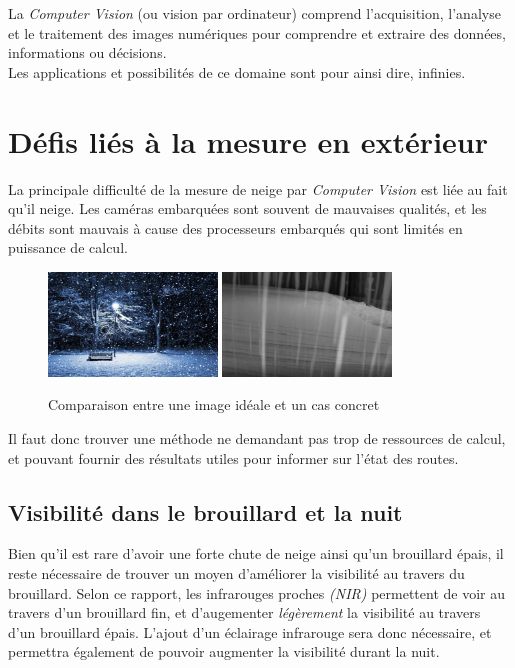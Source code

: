 La \emph{Computer Vision} (ou vision par ordinateur) comprend l'acquisition, l'analyse et
le traitement des images numériques pour comprendre et extraire des données, informations
ou décisions.\\
Les applications et possibilités de ce domaine sont pour ainsi dire, infinies.

\section{Défis liés à la mesure en extérieur}
La principale difficulté de la mesure de neige par \emph{Computer Vision} est liée au fait
qu'il neige. Les caméras embarquées sont souvent de mauvaises qualités, et les débits
sont mauvais à cause des processeurs embarqués qui sont limités en puissance de calcul.

\begin{figure}[H]
    \centering
    \includegraphics[width=0.4\textwidth]{Images/computer_vision/perfect_snow.jpg}
    \includegraphics[width=0.4\textwidth]{Images/computer_vision/real_snow.png}
    \caption[Comparaison image de neige HD et cas concret]{Comparaison entre une image idéale \footnotemark[1] et un cas concret\footnotemark[2]}
    \label{fig:Snow comparison}
\end{figure}

\noindent
Il faut donc trouver une méthode ne demandant pas trop de ressources de calcul, et pouvant fournir
des résultats utiles pour informer sur l'état des routes.
\subsection{Visibilité dans le brouillard et la nuit}
Bien qu'il est rare d'avoir une forte chute de neige ainsi qu'un brouillard épais, il reste nécessaire
de trouver un moyen d'améliorer la visibilité au travers du brouillard.
Selon ce rapport\cite{HAL}, les infrarouges proches \emph{(NIR)} permettent de voir au travers
d'un brouillard fin, et d'augementer \emph{légèrement} la visibilité au travers d'un brouillard épais.
L'ajout d'un éclairage infrarouge sera donc nécessaire, et permettra également de pouvoir augmenter
la visibilité durant la nuit.
\newpage

